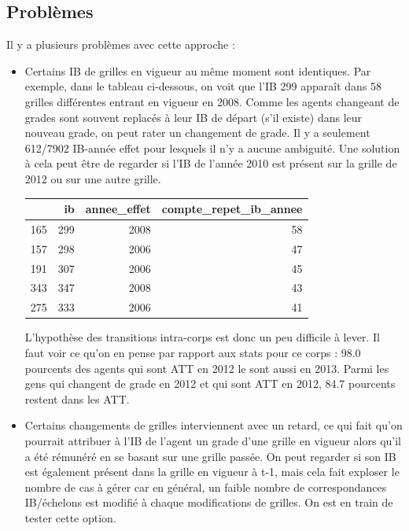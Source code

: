 \documentclass[11pt,a4paper]{article}
\begin{document}
\subsection{Problèmes}
Il y a plusieurs problèmes avec cette approche :
\begin{itemize}
\item Certains IB de grilles en vigueur au même moment sont identiques. Par exemple, dans le tableau ci-dessous, on voit que l'IB 299 apparaît dans 58 grilles différentes entrant en vigueur en 2008. Comme les agents changeant de grades sont souvent replacés à leur IB de départ (s'il existe) dans leur nouveau grade, on peut rater un changement de grade.  Il y a seulement 612/7902 IB-année effet pour lesquels il n'y a aucune ambiguité. Une solution à cela peut être de regarder si l'IB de l'année 2010 est présent sur la grille de 2012 ou sur une autre grille. 

\begin{center}

\begin{tabular}{lrrr}
	\toprule
	{} &   ib &  annee\_effet &  compte\_repet\_ib\_annee \\
	\midrule
	165 &  299 &         2008 &                     58 \\
	157 &  298 &         2006 &                     47 \\
	191 &  307 &         2006 &                     45 \\
	343 &  347 &         2008 &                     43 \\
	275 &  333 &         2006 &                     41 \\
	\bottomrule
\end{tabular}
\end{center}

L'hypothèse des transitions intra-corps est donc un peu difficile à lever. Il faut voir ce qu'on en pense par rapport aux stats pour ce corps : 98.0 pourcents des agents qui sont ATT en 2012 le sont aussi en 2013. Parmi les gens qui changent de grade en 2012 et qui sont ATT en 2012, 84.7 pourcents restent dans les ATT.


\item Certains changements de grilles interviennent avec un retard, ce qui fait qu'on pourrait attribuer à l'IB de l'agent un grade d'une grille en vigueur alors qu'il a été rémunéré en se basant sur une grille passée. On peut regarder si son IB est également présent dans la grille en vigueur à t-1, mais cela fait exploser le nombre de cas à gérer car en général, un faible nombre de correspondances IB/échelons est modifié à chaque modifications de grilles. On est en train de tester cette option.



\end{itemize}
\end{document}
